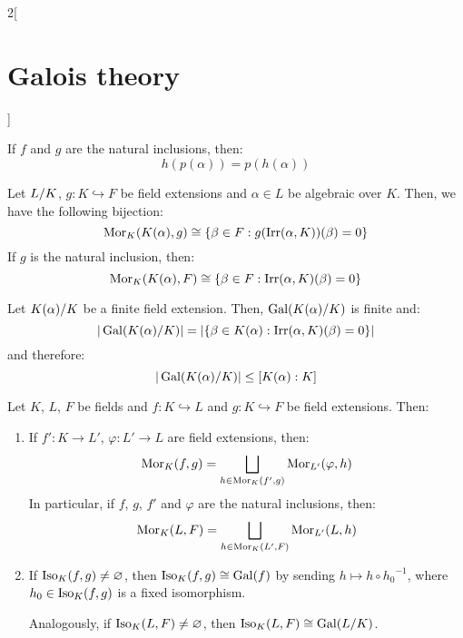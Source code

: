 \documentclass[../../../main.tex]{subfiles}
\begin{document}
\begin{multicols}{2}[\section{Galois theory}]
\begin{lemma}
    If $f$ and $g$ are the natural inclusions, then: $$h(p(\alpha))=p(h(\alpha))$$
  \end{lemma}
  \begin{lemma}
    Let $\quot{L}{K}$, $g:K \hookrightarrow F$ be field extensions and $\alpha\in L$ be algebraic over $K$. Then, we have the following bijection: $$\operatorname{Mor}_K(K(\alpha),g)\cong\{\beta\in F:g(\operatorname{Irr}(\alpha,K))(\beta)=0\}$$
    If $g$ is the natural inclusion, then: $$\operatorname{Mor}_K(K(\alpha),F)\cong\{\beta\in F:\operatorname{Irr}(\alpha,K)(\beta)=0\}$$
  \end{lemma}
  \begin{corollary}
    Let $\quot{K(\alpha)}{K}$ be a finite field extension. Then, $\Gal(\quot{K(\alpha)}{K})$ is finite and:
    $$\textstyle|\Gal(\quot{K(\alpha)}{K})|=|\{\beta\in K(\alpha):\irr(\alpha,K)(\beta)=0\}|$$
    and therefore: $$\textstyle|\Gal(\quot{K(\alpha)}{K})|\leq[K(\alpha):K]$$
  \end{corollary}
  \begin{prop}
    Let $K$, $L$, $F$ be fields and $f:K\hookrightarrow L$ and $g:K\hookrightarrow F$ be field extensions. Then:
    \begin{enumerate}
      \item If $f':K\rightarrow L'$, $\varphi:L'\rightarrow L$ are field extensions, then: $$\operatorname{Mor}_K(f,g)=\bigsqcup_{h\in\operatorname{Mor}_K(f',g)}\operatorname{Mor}_{L'}(\varphi,h)$$
            In particular, if $f$, $g$, $f'$ and $\varphi$ are the natural inclusions, then:
            $$\operatorname{Mor}_K(L,F)=\bigsqcup_{h\in\operatorname{Mor}_K(L',F)}\operatorname{Mor}_{L'}(L,h)$$
      \item If $\operatorname{Iso}_K(f,g)\ne\varnothing$, then $\operatorname{Iso}_K(f,g)\cong\operatorname{Gal}(f)$ by sending $h\mapsto h\circ {h_0}^{-1}$, where $h_0\in\operatorname{Iso}_K(f,g)$ is a fixed isomorphism.

            Analogously, if $\operatorname{Iso}_K(L,F)\ne\varnothing$, then $\Iso_K(L,F)\cong\Gal(\quot{L}{K})$.
    \end{enumerate}
  \end{prop}

\end{multicols}
\end{document}

